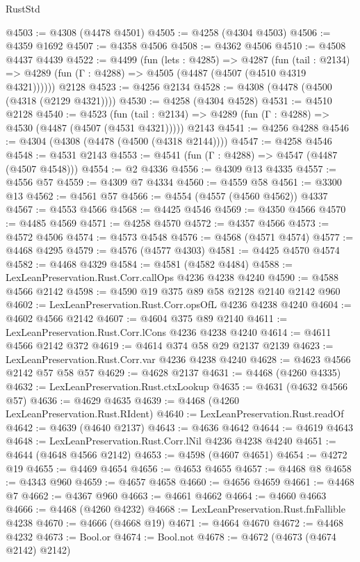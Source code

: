 \begin{lexlean}{RustStd}
\begin{coremodule}
{\begin{coremodule}
{{{{{{{{{{{{{{{{@4503 := @4308 (@4478 @4501)
@4505 := @4258 (@4304 @4503)
@4506 := @4359 @1692
@4507 := @4358 @4506
@4508 := @4362 @4506
@4510 := @4508 @4437 @4439
@4522 := @4499
    (fun (lets : @4285) =>
    @4287
      (fun (tail : @2134) => @4289 (fun (Γ : @4288) => @4505 (@4487 (@4507 (@4510 @4319 @4321))))))
    @2128
@4523 := @4256 @2134
@4528 := @4308 (@4478 (@4500 (@4318 (@2129 @4321))))
@4530 := @4258 (@4304 @4528)
@4531 := @4510 @2128
@4540 := @4523
    (fun (tail : @2134) => @4289 (fun (Γ : @4288) => @4530 (@4487 (@4507 (@4531 @4321)))))
    @2143
@4541 := @4256 @4288
@4546 := @4304 (@4308 (@4478 (@4500 (@4318 @2144))))
@4547 := @4258 @4546
@4548 := @4531 @2143
@4553 := @4541 (fun (Γ : @4288) => @4547 (@4487 (@4507 @4548)))
@4554 := @2 @4336
@4556 := @4309 @13 @4335
@4557 := @4556 @57
@4559 := @4309 @7 @4334
@4560 := @4559 @58
@4561 := @3300 @13
@4562 := @4561 @57
@4566 := @4554 (@4557 (@4560 @4562)) @4337
@4567 := @4553 @4566
@4568 := @4425 @4546
@4569 := @4350 @4566
@4570 := @4485 @4569
@4571 := @4258 @4570
@4572 := @4357 @4566
@4573 := @4572 @4506
@4574 := @4573 @4548
@4576 := @4568 (@4571 @4574)
@4577 := @4468 @4295
@4579 := @4576 (@4577 @4303)
@4581 := @4425 @4570 @4574
@4582 := @4468 @4329
@4584 := @4581 (@4582 @4484)
@4588 := LexLeanPreservation.Rust.Corr.callOps @4236 @4238 @4240
@4590 := @4588 @4566 @2142
@4598 := @4590 @19 @375 @89 @58 @2128 @2140 @2142 @960
@4602 := LexLeanPreservation.Rust.Corr.opsOfL @4236 @4238 @4240
@4604 := @4602 @4566 @2142
@4607 := @4604 @375 @89 @2140
@4611 := LexLeanPreservation.Rust.Corr.lCons @4236 @4238 @4240
@4614 := @4611 @4566 @2142 @372
@4619 := @4614 @374 @58 @29 @2137 @2139
@4623 := LexLeanPreservation.Rust.Corr.var @4236 @4238 @4240
@4628 := @4623 @4566 @2142 @57 @58 @57
@4629 := @4628 @2137
@4631 := @4468 (@4260 @4335)
@4632 := LexLeanPreservation.Rust.ctxLookup
@4635 := @4631 (@4632 @4566 @57)
@4636 := @4629 @4635
@4639 := @4468 (@4260 LexLeanPreservation.Rust.RIdent)
@4640 := LexLeanPreservation.Rust.readOf
@4642 := @4639 (@4640 @2137)
@4643 := @4636 @4642
@4644 := @4619 @4643
@4648 := LexLeanPreservation.Rust.Corr.lNil @4236 @4238 @4240
@4651 := @4644 (@4648 @4566 @2142)
@4653 := @4598 (@4607 @4651)
@4654 := @4272 @19
@4655 := @4469 @4654
@4656 := @4653 @4655
@4657 := @4468 @8
@4658 := @4343 @960
@4659 := @4657 @4658
@4660 := @4656 @4659
@4661 := @4468 @7
@4662 := @4367 @960
@4663 := @4661 @4662
@4664 := @4660 @4663
@4666 := @4468 (@4260 @4232)
@4668 := LexLeanPreservation.Rust.fnFallible @4238
@4670 := @4666 (@4668 @19)
@4671 := @4664 @4670
@4672 := @4468 @4232
@4673 := Bool.or
@4674 := Bool.not
@4678 := @4672 (@4673 (@4674 @2142) @2142)
}}}}}}}}}}}}}}}}
\end{coremodule}}
\end{coremodule}
\end{lexlean}
